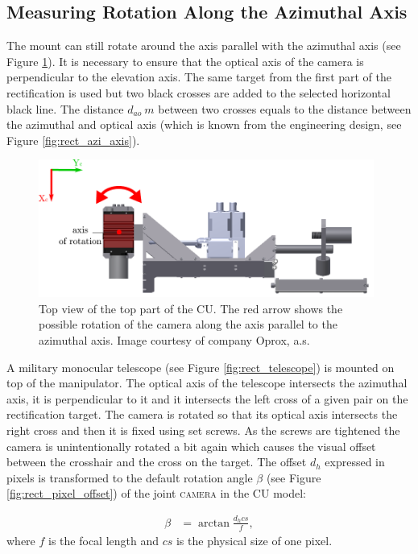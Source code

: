 \subsection{Measuring Rotation Along the Azimuthal Axis}

The mount can still rotate around the axis parallel with the azimuthal axis (see Figure \ref{fig:rect_model_top_view}). It is necessary to ensure that the optical axis of the camera is perpendicular to the elevation axis. The same target from the first part of the rectification is used but two black crosses are added to the selected horizontal black line. The distance $d_{ao}\ m$ between two crosses equals to the distance between the azimuthal and optical axis (which is known from the engineering design, see Figure \ref{fig:rect_azi_axis}).

\begin{figure}[htb]
	\centering
	\includegraphics[width=11cm]{fig/rect_model_top_view.pdf}
	\caption{Top view of the top part of the CU. The red arrow shows the possible rotation of the camera along the axis parallel to the azimuthal axis. Image courtesy of company Oprox, a.s.}
	\label{fig:rect_model_top_view}
\end{figure}

A military monocular telescope (see Figure \ref{fig:rect_telescope}) is mounted on top of the manipulator. The optical axis of the telescope intersects the azimuthal axis, it is perpendicular to it and it intersects the left cross of a given pair on the rectification target. The camera is rotated so that its optical axis intersects the right cross and then it is fixed using set screws. As the screws are tightened the camera is unintentionally rotated a bit again which causes the visual offset between the crosshair and the cross on the target. The offset $d_{h}$ expressed in pixels is transformed to the default rotation angle $\beta$ (see Figure \ref{fig:rect_pixel_offset}) of the joint \textsc{camera} in the CU model:

\begin{equation}
\begin{aligned}
\beta &= \arctan\frac{d_{h}cs}{f},
\end{aligned}
\end{equation}
where $f$ is the focal length and $cs$ is the physical size of one pixel.

